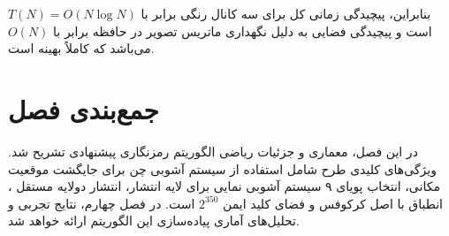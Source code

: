 بنابراین، پیچیدگی زمانی کل برای سه کانال رنگی برابر با $T(N) = O(N \log N)$ است و پیچیدگی فضایی به دلیل نگهداری ماتریس تصویر در حافظه برابر با $O(N)$ می‌باشد که کاملاً بهینه است.

\section{جمع‌بندی فصل}

در این فصل، معماری و جزئیات ریاضی الگوریتم رمزنگاری پیشنهادی تشریح شد. ویژگی‌های کلیدی طرح شامل استفاده از سیستم آشوبی چن برای جایگشت موقعیت مکانی، انتخاب پویای ۹ سیستم آشوبی نمایی برای لایه انتشار، انتشار دولایه مستقل ، انطباق با اصل کرکوفس و فضای کلید ایمن $2^{350}$ است. در فصل چهارم، نتایج تجربی و تحلیل‌های آماری پیاده‌سازی این الگوریتم ارائه خواهد شد.